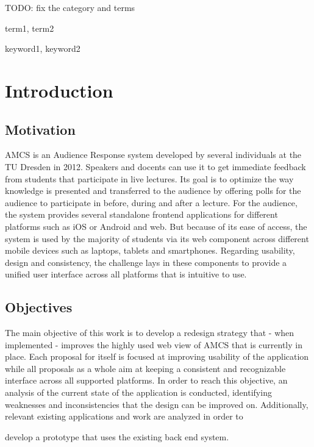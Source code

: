 \documentclass{sigplanconf}
\begin{document}
TODO: fix the category and terms

\terms
term1, term2

\keywords
keyword1, keyword2

\section{Introduction}

\subsection{Motivation}


AMCS is an Audience Response system developed by several individuals at the TU Dresden in 2012. Speakers and docents can use it to get immediate feedback from students that participate in live lectures. Its goal is to optimize the way knowledge is presented and transferred to the audience by offering polls for the audience to participate in before, during and after a lecture.
For the audience, the system provides several standalone frontend applications for different platforms such as iOS or Android and web. But because of its ease of access, the system is used by the majority of students via its web component across different mobile devices such as laptops, tablets and smartphones. 
Regarding usability, design and consistency, the challenge lays in these components to provide a unified user interface across all platforms that is intuitive to use.

\subsection{Objectives}

The main objective of this work is to develop a redesign strategy that - when implemented - improves the highly used web view of AMCS that is currently in place.
Each proposal for itself is focused at improving usability of the application while all proposals as a whole aim at keeping a consistent and recognizable interface across all supported platforms. 
In order to reach this objective, an analysis of the current state of the application is conducted, identifying weaknesses and inconsistencies that the design can be improved on.
Additionally, relevant existing applications and work are analyzed in order to 

develop a prototype that uses the existing back end system.
\end{document}
